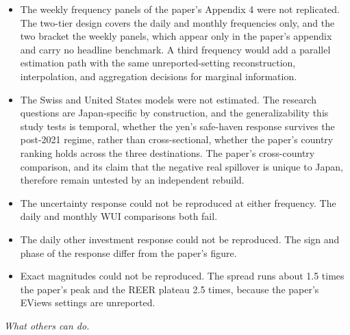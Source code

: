 \begin{itemize}
  \item The weekly frequency panels of the paper's Appendix 4 were not replicated. The two-tier design covers the daily and monthly frequencies only, and the two bracket the weekly panels, which appear only in the paper's appendix and carry no headline benchmark. A third frequency would add a parallel estimation path with the same unreported-setting reconstruction, interpolation, and aggregation decisions for marginal information.
  \item The Swiss and United States models were not estimated. The research questions are Japan-specific by construction, and the generalizability this study tests is temporal, whether the yen's safe-haven response survives the post-2021 regime, rather than cross-sectional, whether the paper's country ranking holds across the three destinations. The paper's cross-country comparison, and its claim that the negative real spillover is unique to Japan, therefore remain untested by an independent rebuild.
  \item The uncertainty response could not be reproduced at either frequency. The daily and monthly WUI comparisons both fail.
  \item The daily other investment response could not be reproduced. The sign and phase of the response differ from the paper's figure.
  \item Exact magnitudes could not be reproduced. The spread runs about 1.5 times the paper's peak and the REER plateau 2.5 times, because the paper's EViews settings are unreported.
\end{itemize}

\textit{What others can do.}

